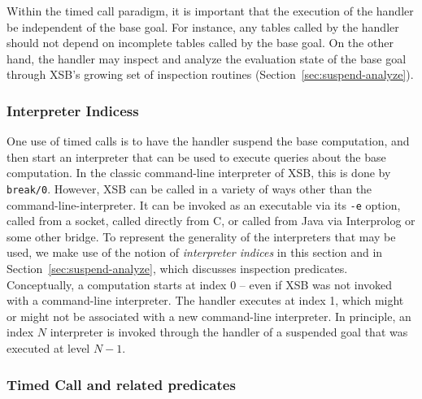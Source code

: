 Within the timed call paradigm, it is important that the execution of
the handler be independent of the base goal.  For instance, any tables
called by the handler should not depend on incomplete tables called by
the base goal.  On the other hand, the handler may inspect and analyze
the evaluation state of the base goal through XSB's growing set of
inspection routines (Section~\ref{sec:suspend-analyze}).

\subsubsection{Interpreter Indicess}
%
One use of timed calls is to have the handler suspend the base
computation, and then start an interpreter that can be used to execute
queries about the base computation.  In the classic command-line
interpreter of XSB, this is done by {\tt break/0}.  However, XSB can
be called in a variety of ways other than the
command-line-interpreter.  It can be invoked as an executable via its
{\tt -e} option, called from a socket, called directly from C, or
called from Java via Interprolog or some other bridge.  To represent
the generality of the interpreters that may be used, we make use of
the notion of {\em interpreter indices} in this section and in
Section~\ref{sec:suspend-analyze}, which discusses inspection
predicates.  Conceptually, a computation starts at index 0 -- even if
XSB was not invoked with a command-line interpreter.  The handler
executes at index 1, which might or might not be associated with a new
command-line interpreter.  In principle, an index $N$ interpreter is
invoked through the handler of a suspended goal that was executed at
level $N-1$.

\subsubsection{Timed Call and related predicates}

